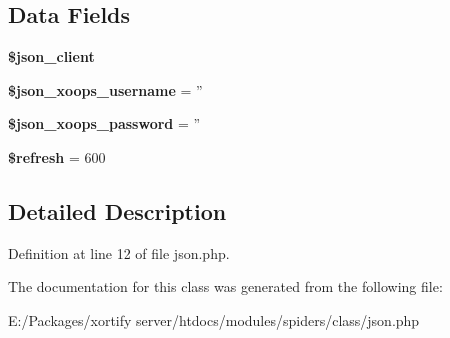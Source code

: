 \subsection*{Data Fields}
\begin{DoxyCompactItemize}
\item 
\hypertarget{class_j_s_o_n_spiders_exchange_a2d091f9d959cab9ac28ad2cc96149447}{{\bfseries \$json\-\_\-client}}\label{class_j_s_o_n_spiders_exchange_a2d091f9d959cab9ac28ad2cc96149447}

\item 
\hypertarget{class_j_s_o_n_spiders_exchange_ac058687d82a56fb93513e7e58c4ec391}{{\bfseries \$json\-\_\-xoops\-\_\-username} = ''}\label{class_j_s_o_n_spiders_exchange_ac058687d82a56fb93513e7e58c4ec391}

\item 
\hypertarget{class_j_s_o_n_spiders_exchange_a7af311f07c1c09254920e6ac0cefe9a9}{{\bfseries \$json\-\_\-xoops\-\_\-password} = ''}\label{class_j_s_o_n_spiders_exchange_a7af311f07c1c09254920e6ac0cefe9a9}

\item 
\hypertarget{class_j_s_o_n_spiders_exchange_a8527f826b6959aaa92b0e51ee427ba1a}{{\bfseries \$refresh} = 600}\label{class_j_s_o_n_spiders_exchange_a8527f826b6959aaa92b0e51ee427ba1a}

\end{DoxyCompactItemize}


\subsection{Detailed Description}


Definition at line 12 of file json.\-php.



The documentation for this class was generated from the following file\-:\begin{DoxyCompactItemize}
\item 
E\-:/\-Packages/xortify server/htdocs/modules/spiders/class/json.\-php\end{DoxyCompactItemize}
